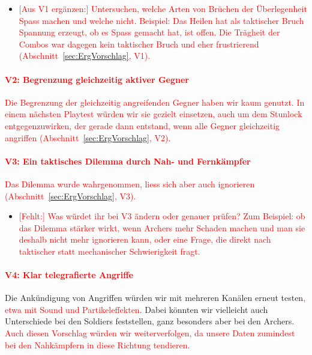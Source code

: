\documentclass[../Main.tex]{subfiles}
\begin{document}
\begin{itemize}[leftmargin=1.5cm]
    \item \textcolor{red}{[Aus V1 ergänzen:] Untersuchen, welche Arten von Brüchen der Überlegenheit Spass machen und welche nicht. Beispiel: Das Heilen hat als taktischer Bruch Spannung erzeugt, ob es Spass gemacht hat, ist offen. Die Trägheit der Combos war dagegen kein taktischer Bruch und eher frustrierend (Abschnitt~\ref{sec:ErgVorschlag}, V1).}
\end{itemize}

\paragraph{\textcolor{red}{V2: Begrenzung gleichzeitig aktiver Gegner}}
\textcolor{red}{Die Begrenzung der gleichzeitig angreifenden Gegner haben wir kaum genutzt. In einem nächsten Playtest würden wir sie gezielt einsetzen, auch um dem Stunlock entgegenzuwirken, der gerade dann entstand, wenn alle Gegner gleichzeitig angriffen (Abschnitt~\ref{sec:ErgVorschlag}, V2).}

\paragraph{\textcolor{red}{V3: Ein taktisches Dilemma durch Nah- und Fernkämpfer}}
\textcolor{red}{Das Dilemma wurde wahrgenommen, liess sich aber auch ignorieren (Abschnitt~\ref{sec:ErgVorschlag}, V3).}

\begin{itemize}[leftmargin=1.5cm]
    \item \textcolor{red}{[Fehlt:] Was würdet ihr bei V3 ändern oder genauer prüfen? Zum Beispiel: ob das Dilemma stärker wirkt, wenn Archers mehr Schaden machen und man sie deshalb nicht mehr ignorieren kann, oder eine Frage, die direkt nach taktischer statt mechanischer Schwierigkeit fragt.}
\end{itemize}

\paragraph{\textcolor{red}{V4: Klar telegrafierte Angriffe}}
Die Ankündigung von Angriffen würden wir mit mehreren Kanälen erneut testen\textcolor{red}{, etwa mit Sound und Partikeleffekten}. Dabei könnten wir vielleicht auch Unterschiede bei den Soldiers feststellen, ganz besonders aber bei den Archers. \textcolor{red}{Auch diesen Vorschlag würden wir weiterverfolgen, da unsere Daten zumindest bei den Nahkämpfern in diese Richtung tendieren.}
\end{document}
